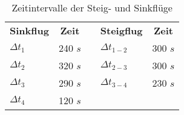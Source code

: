\begin{table}[h]
	\centering
	\begin{tabular}{|l|c|clc}
		\cline{1-2} \cline{4-5}
		\textbf{Sinkflug} & \textbf{Zeit} & \multicolumn{1}{c|}{} & \multicolumn{1}{l|}{\textbf{Steigflug}} & \multicolumn{1}{c|}{\textbf{Zeit}} \\ \cline{1-2} \cline{4-5} 
		$\Delta t_1$      & 240 $s$       & \multicolumn{1}{c|}{} & \multicolumn{1}{l|}{$\Delta t_{1-2}$}   & \multicolumn{1}{c|}{300 $s$}         \\ \cline{1-2} \cline{4-5} 
		$\Delta t_2$      & 320 $s$       & \multicolumn{1}{c|}{} & \multicolumn{1}{l|}{$\Delta t_{2-3}$}   & \multicolumn{1}{c|}{300 $s$}         \\ \cline{1-2} \cline{4-5} 
		$\Delta t_3$      & 290 $s$       & \multicolumn{1}{c|}{} & \multicolumn{1}{l|}{$\Delta t_{3-4}$}   & \multicolumn{1}{c|}{230 $s$}         \\ \cline{1-2} \cline{4-5} 
		$\Delta t_4$      & 120 $s$       &                       &                                         &                                    \\ \cline{1-2}
	\end{tabular}
	\caption{Zeitintervalle der Steig- und Sinkflüge}
	\label{tab:do28-deltat}
\end{table}
\vspace{0.3cm} 

